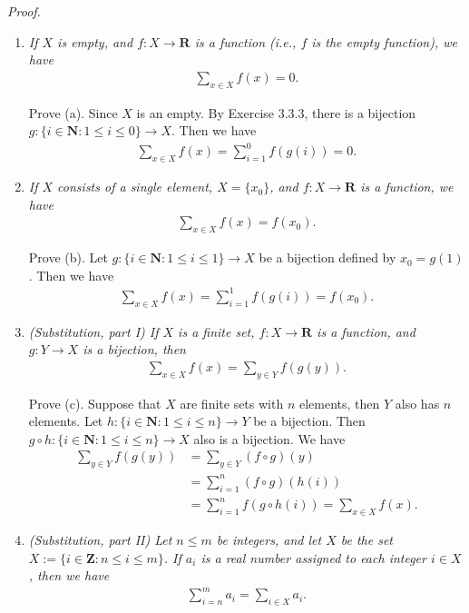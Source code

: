 \documentclass{book}
\newcommand{\pff}{\vspace{.25em}\noindent\emph{Proof.}~~}
\newcounter{Exercise}[section]
\begin{document}
\pff
\begin{enumerate}
    \item \emph{If $X$ is empty, and $f:X\to\mathbf{R}$ is a function (i.e., $f$ is the empty function), we have}
    \begin{align*}
        \sum_{x\in X}f(x)=0.
    \end{align*}

    Prove (a). Since $X$ is an empty. By Exercise 3.3.3, there is a bijection $g:\{i\in\mathbf{N}:1\leq i\leq 0\}\to X$. Then we have
    \begin{align*}
        \sum_{x\in X}f(x)=\sum_{i=1}^{0}f(g(i))=0.
    \end{align*}

    \item \emph{If $X$ consists of a single element, $X=\{x_0\}$, and $f:X\to\mathbf{R}$ is a function, we have}
    \begin{align*}
        \sum_{x\in X}f(x)=f(x_0).
    \end{align*}

    Prove (b). Let $g:\{i\in\mathbf{N}:1\leq i\leq 1\}\to X$ be a bijection defined by $x_0=g(1)$. Then we have
    \begin{align*}
        \sum_{x\in X}f(x)=\sum_{i=1}^{1}f(g(i))=f(x_0).
    \end{align*}

    \item \emph{(Substitution, part I) If $X$ is a finite set, $f: X\to\mathbf{R}$ is a function, and $g:Y\to X$ is a bijection, then}
    \begin{align*}
        \sum_{x\in X}f(x)=\sum_{y\in Y}f(g(y)).
    \end{align*}

    Prove (c). Suppose that $X$ are finite sets with $n$ elements, then $Y$ also has $n$ elements. Let $h:\{i\in\mathbf{N}:1\leq i\leq n\}\to Y$ be a bijection. Then $g\circ h:\{i\in\mathbf{N}:1\leq i\leq n\}\to X$ also is a bijection. We have
    \begin{align*}
        \sum_{y\in Y}f(g(y))
        &=\sum_{y\in Y}(f\circ g)(y)\\
        &=\sum_{i=1}^{n}(f\circ g)(h(i))\\
        &=\sum_{i=1}^{n}f(g\circ h(i))=\sum_{x\in X}f(x).
    \end{align*}

    \item \emph{(Substitution, part I\!I) Let $n\leq m$ be integers, and let $X$ be the set $X:=\{i\in\mathbf{Z}:n\leq i\leq m\}$. If $a_i$ is a real number assigned to each integer $i\in X$, then we have}
    \begin{align*}
        \sum_{i=n}^{m}a_i=\sum_{i\in X}a_i.
    \end{align*}


\end{enumerate}
\end{document}
